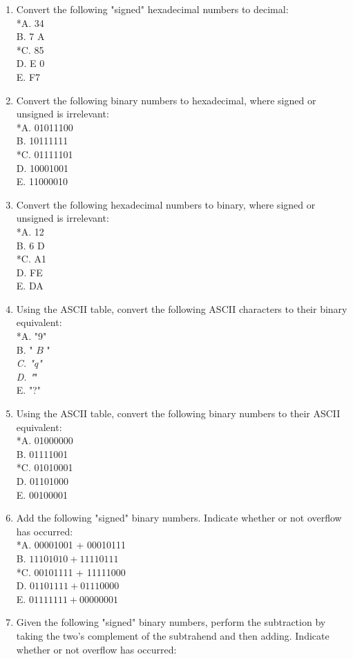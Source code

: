 \documentclass[10pt]{book}
\begin{document}
\begin{enumerate}
B. 100\\
*C. -79\\
D. -112\\
E. -247
  \item Convert the following "signed" hexadecimal numbers to decimal:\\
*A. 34\\
B. 7 A\\
*C. 85\\
D. E 0\\
E. F7
  \item Convert the following binary numbers to hexadecimal, where signed or unsigned is irrelevant:\\
*A. 01011100\\
B. 10111111\\
*C. 01111101\\
D. 10001001\\
E. 11000010
  \item Convert the following hexadecimal numbers to binary, where signed or unsigned is irrelevant:\\
*A. 12\\
B. 6 D\\
*C. A1\\
D. FE\\
E. DA
  \item Using the ASCII table, convert the following ASCII characters to their binary equivalent:\\
*A. "9"\\
B. " $B$ "\\
\textit{C. "q"\\
D. "}"\\
E. "?"
  \item Using the ASCII table, convert the following binary numbers to their ASCII equivalent:\\
*A. 01000000\\
B. 01111001\\
*C. 01010001\\
D. 01101000\\
E. 00100001
  \item Add the following "signed" binary numbers. Indicate whether or not overflow has occurred:\\
*A. 00001001 + 00010111\\
B. $11101010+11110111$\\
*C. 00101111 + 11111000\\
D. $01101111+01110000$\\
E. $01111111+00000001$
  \item Given the following "signed" binary numbers, perform the subtraction by taking the two's complement of the subtrahend and then adding. Indicate whether or not overflow has occurred:\\

\end{enumerate}
\end{document}
